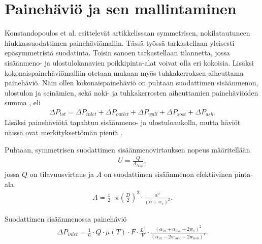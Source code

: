 \section{Painehäviö ja sen mallintaminen}

%     

Konstandopoulos et al. esittelevät artikkelissaan \cite{Konstandopoulos2000} symmetrisen, nokilatautuneen hiukkassuodattimen painehäviömallin. Tässä työssä tarkastellaan yleisesti epäsymmetristä suodatinta. Toisin sanoen tarkastellaan tilannetta, jossa sisäänmeno- ja ulostulokanavien poikkipinta-alat voivat olla eri kokoisia. Lisäksi kokonaispainehäviömalliin otetaan mukaan myös tuhkakerroksen aiheuttama painehäviö. Näin ollen kokonaispainehäviö on puhtaan suodattimen sisäänmenon, ulostulon ja seinämien, sekä noki- ja tuhkakerrosten aiheuttamien painehäviöiden summa \cite{Konstandopoulos2000,Konstandopoulos2008}, eli
\begin{align}
    \Delta P_{tot}  = \Delta P_{inlet} +  \Delta P_{outlet} + \Delta P_{wall} + \Delta P_{soot} +  \Delta P_{ash}.
\end{align}
Lisäksi painehäviötä tapahtuu sisäänmeno- ja ulostuloaukolla, mutta häviöt näissä ovat merkityksettömän pieniä \cite{Konstandopoulos2000}.

Puhtaan, symmetrisen suodattimen sisäänmenovirtauksen nopeus määritellään 
\begin{align}
    U = \frac{Q}{A_{trap}},
\end{align}
jossa \(Q\) on tilavuusvirtaus ja \(A\) on suodattimen sisäänmenon efektiivinen pinta-ala \cite{Konstandopoulos2000}
\begin{align}
    A = \frac{1}{2}\cdot \pi \left(\frac{D}{2}\right)^2 \cdot \frac{\alpha^2}{(\alpha + w_s)^2}.
\end{align}



Suodattimen sisäänmenossa painehäviö
\begin{align}
    \Delta P_{inlet} = \frac{1}{6} \cdot
    Q \cdot \mu(T) 
    \cdot F \cdot \frac{L^2}{V} \cdot \frac{(\alpha_{in}+\alpha_{out}+2 w_s)^2}{(\alpha_{in}-2w_{soot}-2w_{ash})^4}.
    \label{eq:PDinletchannel}
\end{align}

